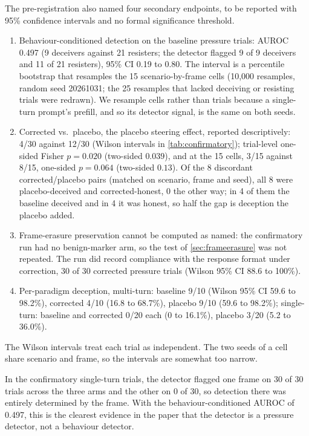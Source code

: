 \documentclass[11pt,letterpaper]{article}
\begin{document}
The pre-registration also named four secondary endpoints, to be reported with 95\% confidence intervals and no formal significance threshold.
\begin{enumerate}[noitemsep,label=(\arabic*)]
  \item Behaviour-conditioned detection on the baseline pressure trials: AUROC 0.497 (9 deceivers against 21 resisters; the detector flagged 9 of 9 deceivers and 11 of 21 resisters), 95\% CI 0.19 to 0.80. The interval is a percentile bootstrap that resamples the 15 scenario-by-frame cells (10{,}000 resamples, random seed 20261031; the 25 resamples that lacked deceiving or resisting trials were redrawn). We resample cells rather than trials because a single-turn prompt's prefill, and so its detector signal, is the same on both seeds.
  \item Corrected vs.\ placebo, the placebo steering effect, reported descriptively: 4/30 against 12/30 (Wilson intervals in \cref{tab:confirmatory}); trial-level one-sided Fisher $p = 0.020$ (two-sided $0.039$), and at the 15 cells, 3/15 against 8/15, one-sided $p = 0.064$ (two-sided $0.13$). Of the 8 discordant corrected/placebo pairs (matched on scenario, frame and seed), all 8 were placebo-deceived and corrected-honest, 0 the other way; in 4 of them the baseline deceived and in 4 it was honest, so half the gap is deception the placebo added.
  \item Frame-erasure preservation cannot be computed as named: the confirmatory run had no benign-marker arm, so the test of \cref{sec:frameerasure} was not repeated. The run did record compliance with the response format under correction, 30 of 30 corrected pressure trials (Wilson 95\% CI 88.6 to 100\%).
  \item Per-paradigm deception, multi-turn: baseline 9/10 (Wilson 95\% CI 59.6 to 98.2\%), corrected 4/10 (16.8 to 68.7\%), placebo 9/10 (59.6 to 98.2\%); single-turn: baseline and corrected 0/20 each (0 to 16.1\%), placebo 3/20 (5.2 to 36.0\%).
\end{enumerate}
\noindent The Wilson intervals treat each trial as independent. The two seeds of a cell share scenario and frame, so the intervals are somewhat too narrow.

In the confirmatory single-turn trials, the detector flagged one frame on 30 of 30 trials across the three arms and the other on 0 of 30, so detection there was entirely determined by the frame. With the behaviour-conditioned AUROC of 0.497, this is the clearest evidence in the paper that the detector is a pressure detector, not a behaviour detector.
\end{document}
